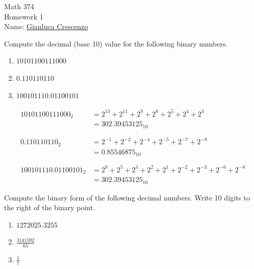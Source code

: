 \documentclass[11pt,twoside,openany]{memoir}
\begin{document}
\begin{center}
{\large Math 374 \\[0.1in]Homework 1 \\[0.1in]}
{Name:} {\underline{Gianluca Crescenzo\hspace*{2in}}}\\[0.15in]
\end{center}
\vspace{4pt}
    \begin{problem}
        Compute the decimal (base 10) value for the following binary numbers.
            \begin{enumerate}[label = (\arabic*),itemsep=1pt,topsep=3pt]
                \item $10101100111000 $
                \item $0.110110110 $
                \item $100101110.01100101 $
            \end{enumerate}
    \end{problem}
        \begin{solution}
            \begin{equation*}
            \begin{split}
                10101100111000_2
                & = 2^{13} + 2^{11} +2^9 + 2^8 + 2^5 + 2^4 + 2^3 \\
                & = 302.39453125_{10} \\
                &\phantom{=} \\
                0.110110110_2
                & = 2^{-1} + 2^{-2} + 2^{-4} + 2^{-5} + 2^{-7} + 2^{-8} \\
                & = 0.85546875_{10} \\
                &\phantom{=} \\
                100101110.01100101_2 
                & = 2^8 + 2^5 + 2^3 + 2^2 + 2^1 + 2^{-2} + 2^{-3} + 2^{-6} + 2^{-8} \\
                & = 302.39453125_{10}
            \end{split}
            \end{equation*}
        \end{solution}
    \begin{problem}
        Compute the binary form of the following decimal numbers. Write 10 digits to the right of the binary point.
            \begin{enumerate}[label = (\arabic*),itemsep=1pt,topsep=3pt]
                \item $1272025.3255$
                \item $\frac{3141592}{65}$
                \item $\frac{1}{7}$
            \end{enumerate}
    \end{problem}
\end{document}
